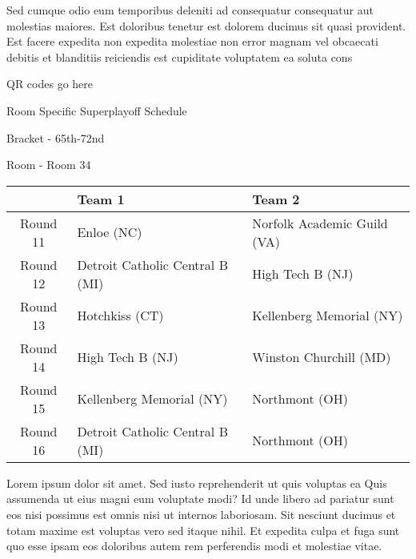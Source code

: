 \documentclass{article}%
\begin{document}
\newline%
    Sed cumque odio eum temporibus deleniti ad consequatur consequatur aut molestias maiores. Est doloribus tenetur est dolorem ducimus sit quasi provident. Est facere expedita non expedita molestiae non error magnam vel obcaecati debitis et blanditiis reiciendis est cupiditate voluptatem ea soluta cons%
\vspace*{140pt}%
\begin{center}%
\begin{Huge}%
QR codes go here%
\end{Huge}%
\end{center}%
\newpage%
\begin{center}%
\begin{Huge}%
Room Specific Superplayoff Schedule%
\end{Huge}%
\vspace*{8pt}%
\linebreak%
\begin{Large}%
Bracket {-} 65th{-}72nd%
\end{Large}%
\vspace*{8pt}%
\linebreak%
\vspace*{8pt}%
\begin{Large}%
Room {-} Room 34%
\end{Large}%
\end{center}%
%
\begin{tabularx}{\textwidth}{|c|Y|Y|}%
\hline%
&Team 1&Team 2\\%
\hline%
Round 11&Enloe (NC)&Norfolk Academic Guild (VA)\\%
Round 12&Detroit Catholic Central B (MI)&High Tech B (NJ)\\%
Round 13&Hotchkiss (CT)&Kellenberg Memorial (NY)\\%
Round 14&High Tech B (NJ)&Winston Churchill (MD)\\%
Round 15&Kellenberg Memorial (NY)&Northmont (OH)\\%
Round 16&Detroit Catholic Central B (MI)&Northmont (OH)\\%
\hline%
\end{tabularx}%
\vspace*{8pt}%
\newline%
    Lorem ipsum dolor sit amet. Sed iusto reprehenderit ut quis voluptas ea Quis assumenda ut eius magni eum voluptate modi? Id unde libero ad pariatur sunt eos nisi possimus est omnis nisi ut internos laboriosam. Sit nesciunt ducimus et totam maxime est voluptas vero sed itaque nihil. Et expedita culpa et fuga sunt quo esse ipsam eos doloribus autem rem perferendis modi et molestiae vitae.\newline%
\end{document}

